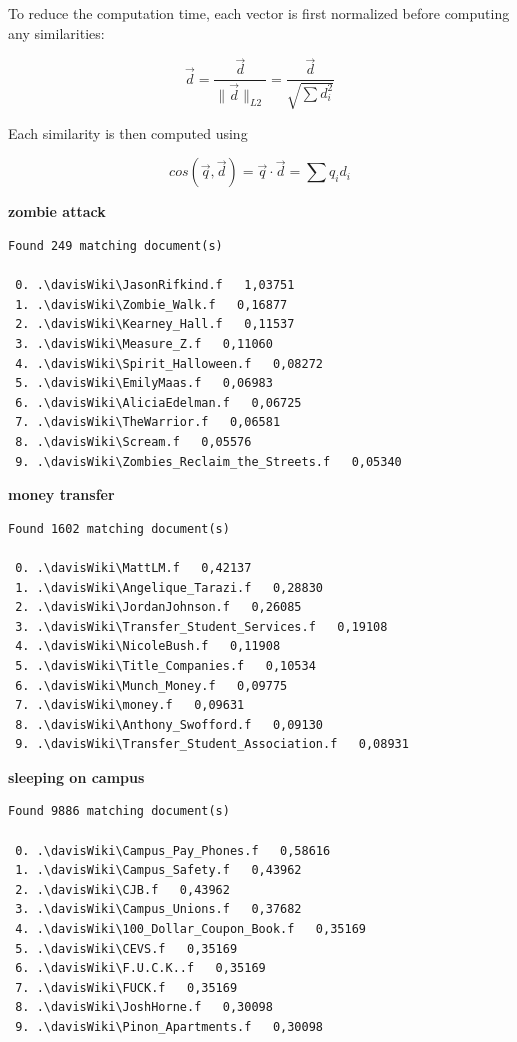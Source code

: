 To reduce the computation time, each vector is first normalized before computing any similarities:

\begin{equation}
\vec{d} = \frac{\vec{d}}{\|\vec{d}\|_{L2}} = \frac{\vec{d}}{\sqrt{\sum{d_i^2}}}
\end{equation}

Each similarity is then computed using 

\begin{equation}
cos(\vec{q}, \vec{d}) = \vec{q} \cdot \vec{d} = \sum{q_i d_i}
\end{equation}

\textbf{zombie attack}\\
\begin{verbatim}
Found 249 matching document(s)

 0. .\davisWiki\JasonRifkind.f   1,03751
 1. .\davisWiki\Zombie_Walk.f   0,16877
 2. .\davisWiki\Kearney_Hall.f   0,11537
 3. .\davisWiki\Measure_Z.f   0,11060
 4. .\davisWiki\Spirit_Halloween.f   0,08272
 5. .\davisWiki\EmilyMaas.f   0,06983
 6. .\davisWiki\AliciaEdelman.f   0,06725
 7. .\davisWiki\TheWarrior.f   0,06581
 8. .\davisWiki\Scream.f   0,05576
 9. .\davisWiki\Zombies_Reclaim_the_Streets.f   0,05340
\end{verbatim}

\textbf{money transfer}\\
\begin{verbatim}
Found 1602 matching document(s)

 0. .\davisWiki\MattLM.f   0,42137
 1. .\davisWiki\Angelique_Tarazi.f   0,28830
 2. .\davisWiki\JordanJohnson.f   0,26085
 3. .\davisWiki\Transfer_Student_Services.f   0,19108
 4. .\davisWiki\NicoleBush.f   0,11908
 5. .\davisWiki\Title_Companies.f   0,10534
 6. .\davisWiki\Munch_Money.f   0,09775
 7. .\davisWiki\money.f   0,09631
 8. .\davisWiki\Anthony_Swofford.f   0,09130
 9. .\davisWiki\Transfer_Student_Association.f   0,08931
\end{verbatim}

\textbf{sleeping on campus}\\
\begin{verbatim}
Found 9886 matching document(s)

 0. .\davisWiki\Campus_Pay_Phones.f   0,58616
 1. .\davisWiki\Campus_Safety.f   0,43962
 2. .\davisWiki\CJB.f   0,43962
 3. .\davisWiki\Campus_Unions.f   0,37682
 4. .\davisWiki\100_Dollar_Coupon_Book.f   0,35169
 5. .\davisWiki\CEVS.f   0,35169
 6. .\davisWiki\F.U.C.K..f   0,35169
 7. .\davisWiki\FUCK.f   0,35169
 8. .\davisWiki\JoshHorne.f   0,30098
 9. .\davisWiki\Pinon_Apartments.f   0,30098
\end{verbatim}

